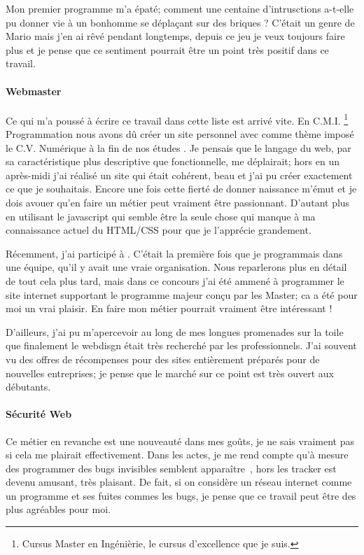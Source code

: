 \documentclass[12pt, a4paper]{report} %
\begin{document}
Mon premier programme \small{\emph{}} m'a épaté; comment une centaine d'intrusctions a-t-elle pu donner vie à un bonhomme se déplaçant sur des briques ? C'était un genre de Mario mais j'en ai rêvé pendant longtemps, depuis ce jeu je veux toujours faire plus et je pense que ce sentiment pourrait être un point très positif dans ce travail.

\paragraph{Webmaster}
Ce qui m'a poussé à écrire ce travail dans cette liste est arrivé vite. En C.M.I. \footnote{Cursus Master en Ingénièrie, le cursus d'excellence que je suis.} Programmation nous avons dû créer un site personnel avec comme thème imposé le \og C.V. Numérique à la fin de nos études \fg. Je pensais que le langage du web, par sa caractéristique plus descriptive que fonctionnelle, me déplairait; hors en un après-midi j'ai réalisé un site qui était cohérent, beau et j'ai pu créer exactement ce que je souhaitais. Encore une fois cette fierté de donner naissance m'émut et je dois avouer qu'en faire un métier peut vraiment être passionnant. D'autant plus en utilisant le javascript qui semble être la seule chose qui manque à ma connaissance actuel du HTML/CSS pour que je l'apprécie grandement.

Récemment, j'ai participé à \og \lni \fg . C'était la première fois que je programmais dans une équipe, qu'il y avait une vraie organisation. Nous reparlerons plus en détail de tout cela plus tard, mais dans ce concours j'ai été ammené à programmer le site internet supportant le programme majeur conçu par les Master; ca a été pour moi un vrai plaisir. En faire mon métier pourrait vraiment être intéressant !

D'ailleurs, j'ai pu m'apercevoir au long de mes longues promenades sur la toile que finalement le webdisgn était très recherché par les professionnels. J'ai souvent vu des offres de récompenses pour des sites entièrement préparés pour de nouvelles entreprises; je pense que le marché sur ce point est très ouvert aux débutants. 

\paragraph{Sécurité Web}
Ce métier en revanche est une nouveauté dans mes goûts, je ne sais vraiment pas si cela me plairait effectivement. Dans les actes, je me rend compte qu'à mesure des programmer des bugs \og invisibles \fg semblent apparaître~\emph{}, hors les tracker est devenu amusant, très plaisant. De fait, si on considère un réseau internet comme un programme et ses fuites commes les bugs, je pense que ce travail peut être des plus agréables pour moi.
\end{document}
